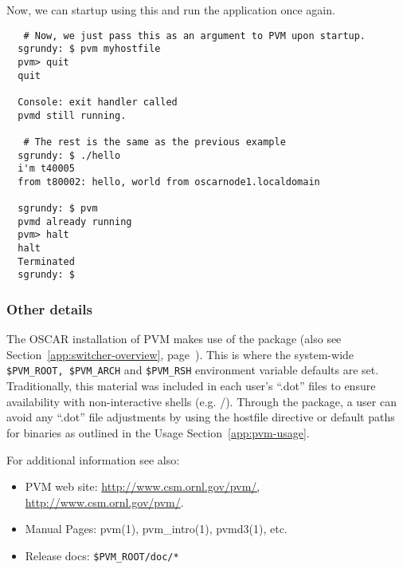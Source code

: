 \noindent Now, we can startup  using this 
and run the  application once again.

\begin{small}
\begin{verbatim}
   # Now, we just pass this as an argument to PVM upon startup.
  sgrundy: $ pvm myhostfile
  pvm> quit
  quit
  
  Console: exit handler called
  pvmd still running.

   # The rest is the same as the previous example
  sgrundy: $ ./hello
  i'm t40005
  from t80002: hello, world from oscarnode1.localdomain

  sgrundy: $ pvm
  pvmd already running
  pvm> halt
  halt
  Terminated
  sgrundy: $
\end{verbatim}
\end{small}

\subsubsection{Other details}

The OSCAR installation of PVM makes use of the 
package (also see Section~\ref{app:switcher-overview},
page~\pageref{app:switcher-overview}).  This is where the system-wide
\verb=$PVM_ROOT, $PVM_ARCH= and \verb=$PVM_RSH= environment variable
defaults are set.  Traditionally, this material was included in each
user's ``.dot'' files to ensure availability with non-interactive
shells (e.g. /).  Through the 
package, a user can avoid any ``.dot'' file adjustments by using the
hostfile directive or default paths for binaries as outlined in the
Usage Section~\ref{app:pvm-usage}.

\noindent For additional information see also:
\begin{itemize}
	\item PVM web site: \url{http://www.csm.ornl.gov/pvm/, http://www.csm.ornl.gov/pvm/}.
	\item Manual Pages: pvm(1), pvm\_intro(1), pvmd3(1), etc.
	\item Release docs: \verb=$PVM_ROOT/doc/*=
\end{itemize}

